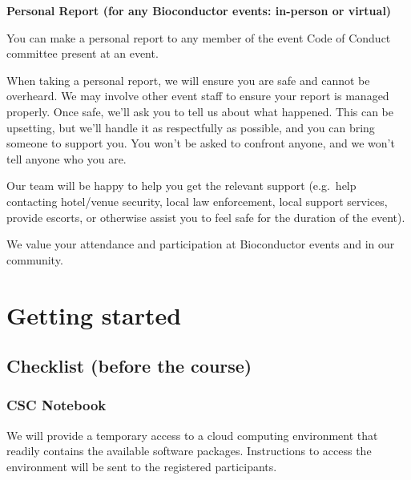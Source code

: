 \documentclass[
  oneside]{book}
\begin{document}
\textbf{Personal Report (for any Bioconductor events: in-person or virtual)}

You can make a personal report to any member of the event Code of Conduct committee present at an event.

When taking a personal report, we will ensure you are safe and cannot be overheard. We may involve other event staff to ensure your report is managed properly. Once safe, we'll ask you to tell us about what happened. This can be upsetting, but we'll handle it as respectfully as possible, and you can bring someone to support you. You won't be asked to confront anyone, and we won't tell anyone who you are.

Our team will be happy to help you get the relevant support (e.g.~help contacting hotel/venue security, local law enforcement, local support services, provide escorts, or otherwise assist you to feel safe for the duration of the event).

We value your attendance and participation at Bioconductor events and in our community.

\hypertarget{start}{%
\chapter{Getting started}\label{start}}

\hypertarget{checklist-before-the-course}{%
\section{Checklist (before the course)}\label{checklist-before-the-course}}

\hypertarget{csc-notebook}{%
\subsection{CSC Notebook}\label{csc-notebook}}

We will provide a temporary access to a cloud computing environment
that readily contains the available software packages. Instructions to access
the environment will be sent to the registered participants.
\end{document}
